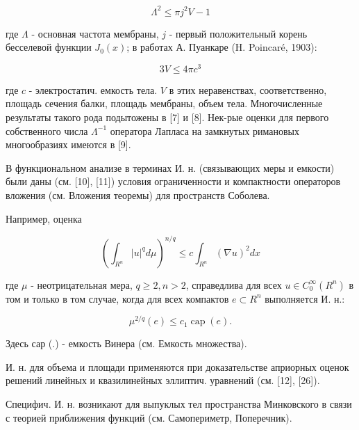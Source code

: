 \documentclass[10pt]{article}
\begin{document}
\[

\Lambda^{2} \leqslant \pi j^{2} V-1

\]



где $\Lambda$ - основная частота мембраны, $j$ - первый положительный корень бесселевой функции $J_{0}(x)$; в работах А. Пуанкаре (H. Poincaré, 1903):



\[

3 V \leqslant 4 \pi c^{3}

\]



где $c$ - электростатич. емкость тела. $V$ в этих неравенствах, соответственно, площадь сечения балки, площадь мембраны, объем тела. Многочисленные результаты такого рода подытожены в [7] и [8]. Нек-рые оценки для первого собственного числа $\Lambda^{-1}$ оператора Лапласа на замкнутых римановых многообразиях имеются в [9].



В функциональном анализе в терминах И. н. (связывающих меры и емкости) были даны (см. [10], [11]) условия ограниченности и компактности операторов вложения (см. Вложения теоремы) для пространств Соболева.



Например, оценка



\[

\left(\int_{R^{n}}|u|^{q} d \mu\right)^{n / q} \leqslant c \int_{R^{n}}(\nabla u)^{2} d x

\]



где $\mu$ - неотрицательная мера, $q \geqslant 2, n>2$, справедлива для всех $u \in C_{0}^{\infty}\left(R^{n}\right)$ в том и только в том случае, когда для всех компактов $e \subset R^{n}$ выполняется И. н.:



\[

\mu^{2 / q}(e) \leqslant c_{1} \operatorname{cap}(e) .

\]



Здесь сар (.) - емкость Винера (см. Емкость множества).



И. н. для объема и площади применяются при доказательстве априорных оценок решений линейных и квазилинейных эллиптич. уравнений (см. [12], [26]).



Специфич. И. н. возникают для выпуклых тел пространства Минковского в связи с теорией приближения функций (см. Самопериметр, Поперечник).
\end{document}
